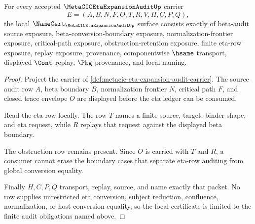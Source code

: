 \begin{theorem}
\label{thm:metacic-eta-expansion-audit-namecert-obligations}
For every accepted $\MetaCICEtaExpansionAuditUp$ carrier
$$
E=(A,B,N,F,O,T,R,V,H,C,P,Q),
$$
the local $\NameCert_{\MetaCICEtaExpansionAuditUp}$ surface consists exactly of
beta-audit source exposure, beta-conversion-boundary exposure,
normalization-frontier exposure, critical-path exposure,
obstruction-retention exposure, finite eta-row exposure, replay exposure,
provenance, componentwise $\hsame$ transport, displayed $\Cont$ replay,
$\Pkg$ provenance, and local naming.
\end{theorem}
\begin{proof}
Project the carrier of \autoref{def:metacic-eta-expansion-audit-carrier}. The
source audit row $A$, beta boundary $B$, normalization frontier $N$, critical
path $F$, and closed trace envelope $O$ are displayed before the eta ledger can
be consumed.

Read the eta row locally. The row $T$ names a finite source, target, binder
shape, and eta request, while $R$ replays that request against the displayed
beta boundary.

The obstruction row remains present. Since $O$ is carried with $T$ and $R$, a
consumer cannot erase the boundary cases that separate eta-row auditing from
global conversion equality.

Finally $H,C,P,Q$ transport, replay, source, and name exactly that packet. No
row supplies unrestricted eta conversion, subject reduction, confluence,
normalization, or host conversion equality, so the local certificate is limited
to the finite audit obligations named above.
\end{proof}

